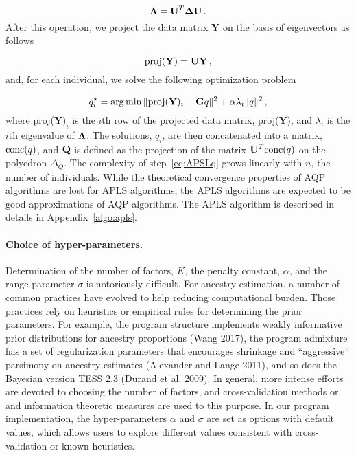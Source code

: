 $$
{\bf \Lambda} = {\bf U}^T {\bf \Delta} {\bf U} \, .
$$
\noindent  After this operation, we project the data matrix {\bf Y} on the basis of eigenvectors as follows

$$
{\rm proj} ({\bf Y}) = {\bf U}{\bf Y} \, , 
$$
\noindent and, for each individual, we solve the following optimization problem

\begin{equation}
q_i^\star = \arg \min  \|  {\rm proj} ({\bf Y})_i  - {\bf G} q \|^2 + \alpha \lambda_i \| q \|^2  \, ,
\label{eq:APSLq}
\end{equation}
\noindent where proj({\bf Y}$)_i$ is the $i$th row of the projected data matrix,
proj({\bf Y}), and $\lambda_i$ is the $i$th eigenvalue of ${\bf \Lambda}$. The
solutions, $q_i$, are then concatenated into a matrix, ${\rm conc}(q)$, and
${\bf Q}$ is defined as the projection of the matrix ${\bf U}^T {\rm conc}(q)$
on the polyedron $\Delta_Q$. The complexity of step~\eqref{eq:APSLq} grows
linearly with $n$, the number of individuals. While the theoretical convergence
properties of AQP algorithms are lost for APLS algorithms, the APLS algorithms
are expected to be good approximations of AQP algorithms. The APLS algorithm is
described in details in Appendix~\ref{algo:apls}.


\paragraph{Choice of hyper-parameters.} Determination of the number of factors,
$K$, the penalty constant, $\alpha$, and the range parameter $\sigma$ is
notoriously difficult. For ancestry estimation, a number of common practices
have evolved to help reducing computational burden. Those practices rely on
heuristics or empirical rules for determining the prior parameters. For example,
the program structure implements weakly informative prior distributions for
ancestry proportions (Wang 2017), the program admixture has a set of
regularization parameters that encourages shrinkage and “aggressive” parsimony
on ancestry estimates (Alexander and Lange 2011), and so does the Bayesian
version TESS 2.3 (Durand et al. 2009). In general, more intense efforts are
devoted to choosing the number of factors, and cross-validation methods or and
information theoretic measures are used to this purpose. In our program
implementation, the hyper-parameters $\alpha$ and $\sigma$ are set as options
with default values, which allows users to explore different values consistent
with cross-validation or known heuristics.

